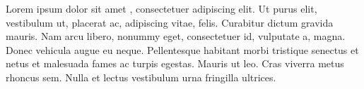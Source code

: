 \documentclass[11pt]{scrartcl}
\begin{document}
    Lorem ipsum dolor sit amet \cite{delzottismartnic}, consectetuer adipiscing elit.
    Ut purus elit, vestibulum ut, placerat ac, adipiscing vitae, felis. Curabitur
    dictum gravida mauris. Nam arcu libero, nonummy eget, consectetuer id, vulputate
    a, magna. Donec vehicula augue eu neque. Pellentesque habitant morbi tristique
    senectus et netus et malesuada fames ac turpis egestas. Mauris ut leo. Cras
    viverra \cite{derdma} metus rhoncus sem. Nulla et lectus vestibulum
    urna fringilla ultrices.
    \nocite{higginsonreal}

    \printbibliography
\end{document}
